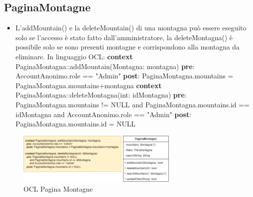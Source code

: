 \documentclass[a4paper,12pt]{article}
\begin{document}
\subsection{PaginaMontagne}
\begin{itemize}
   \item L'addMountain() e la deleteMountain() di una montagna può essere eseguito solo se l'accesso è stato fatto dall'amministratore, la deleteMontagna() è possibile solo se sono presenti montagne e corrispondono alla montagna da eliminare. \newline \newline
   In linguaggio OCL:\newline
   \textbf{context}  PaginaMontagna::addMountain(Montagna: montagna)\newline
    \textbf{pre}: AccountAnonimo.role == "Admin" \newline
    \textbf{post}: PaginaMontagna.mountains = PaginaMontagna.mountains+montagna\newline\newline
    \textbf{context}  PaginaMontagna::deleteMontagna(int: idMontagna)\newline
    \textbf{pre}: PaginaMontagna.mountains != NULL and PaginaMontagna.mountains.id == idMontagna and AccountAnonimo.role == "Admin" \newline
    \textbf{post}: PaginaMontagna.mountains.id = NULL 
\end{itemize}

\begin{figure}[H]
   \centering
   \includegraphics[width=0.7\textwidth] {D3/img/pagina_montagne_OCL.png}
    \caption{OCL Pagina Montagne}
\end{figure}
\end{document}
